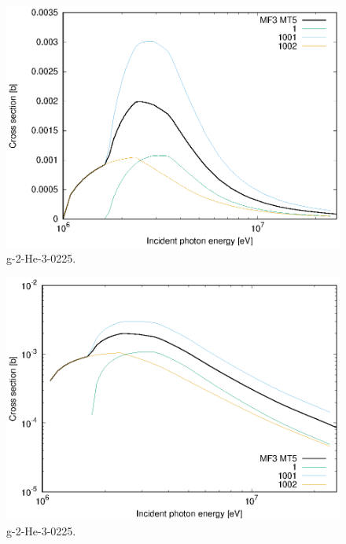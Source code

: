 \begin{figure}
 \includegraphics[width=\linewidth]{eps/g_2-He-3_0225.eps}
  \caption{g-2-He-3-0225.}
\end{figure}
\begin{figure}
 \includegraphics[width=\linewidth]{eps-log/g_2-He-3_0225.eps}
 \caption{g-2-He-3-0225.}
\end{figure}
\newpage \clearpage

